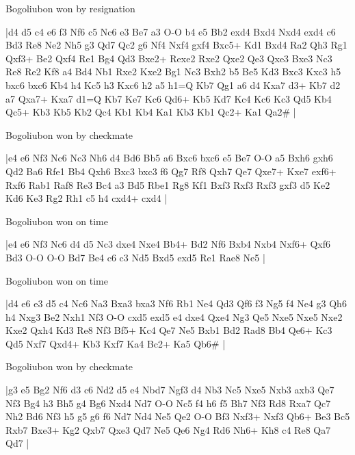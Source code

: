 Bogoliubon won by resignation

\makegametitle
|d4 d5 c4 e6 f3 Nf6 c5 Nc6 e3 Be7 a3 O-O b4 e5 Bb2 exd4 Bxd4 Nxd4 exd4 c6 Bd3 Re8 Ne2 Nh5 g3 Qd7 Qc2 g6 Nf4 Nxf4 gxf4 Bxc5+ Kd1 Bxd4 Ra2 Qh3 Rg1 Qxf3+ Be2 Qxf4 Re1 Bg4 Qd3 Bxe2+ Rexe2 Rxe2 Qxe2 Qe3 Qxe3 Bxe3 Nc3 Re8 Re2 Kf8 a4 Bd4 Nb1 Rxe2 Kxe2 Bg1 Nc3 Bxh2 b5 Be5 Kd3 Bxc3 Kxc3 h5 bxc6 bxc6 Kb4 h4 Kc5 h3 Kxc6 h2 a5 h1=Q Kb7 Qg1 a6 d4 Kxa7 d3+ Kb7 d2 a7 Qxa7+ Kxa7 d1=Q Kb7 Ke7 Kc6 Qd6+ Kb5 Kd7 Kc4 Kc6 Kc3 Qd5 Kb4 Qc5+ Kb3 Kb5 Kb2 Qc4 Kb1 Kb4 Ka1 Kb3 Kb1 Qc2+ Ka1 Qa2\#  |

\showboard

Bogoliubon won by checkmate

\makegametitle
|e4 e6 Nf3 Nc6 Nc3 Nh6 d4 Bd6 Bb5 a6 Bxc6 bxc6 e5 Be7 O-O a5 Bxh6 gxh6 Qd2 Ba6 Rfe1 Bb4 Qxh6 Bxc3 bxc3 f6 Qg7 Rf8 Qxh7 Qe7 Qxe7+ Kxe7 exf6+ Rxf6 Rab1 Raf8 Re3 Bc4 a3 Bd5 Rbe1 Rg8 Kf1 Bxf3 Rxf3 Rxf3 gxf3 d5 Ke2 Kd6 Ke3 Rg2 Rh1 c5 h4 cxd4+ cxd4  |

\showboard

Bogoliubon won on time

\makegametitle
|e4 e6 Nf3 Nc6 d4 d5 Nc3 dxe4 Nxe4 Bb4+ Bd2 Nf6 Bxb4 Nxb4 Nxf6+ Qxf6 Bd3 O-O O-O Bd7 Be4 c6 c3 Nd5 Bxd5 exd5 Re1 Rae8 Ne5  |

\showboard

Bogoliubon won on time

\makegametitle
|d4 e6 e3 d5 c4 Nc6 Na3 Bxa3 bxa3 Nf6 Rb1 Ne4 Qd3 Qf6 f3 Ng5 f4 Ne4 g3 Qh6 h4 Nxg3 Be2 Nxh1 Nf3 O-O cxd5 exd5 e4 dxe4 Qxe4 Ng3 Qe5 Nxe5 Nxe5 Nxe2 Kxe2 Qxh4 Kd3 Re8 Nf3 Bf5+ Kc4 Qe7 Ne5 Bxb1 Bd2 Rad8 Bb4 Qe6+ Kc3 Qd5 Nxf7 Qxd4+ Kb3 Kxf7 Ka4 Bc2+ Ka5 Qb6\#  |

\showboard

Bogoliubon won by checkmate

\makegametitle
|g3 e5 Bg2 Nf6 d3 c6 Nd2 d5 e4 Nbd7 Ngf3 d4 Nb3 Nc5 Nxe5 Nxb3 axb3 Qe7 Nf3 Bg4 h3 Bh5 g4 Bg6 Nxd4 Nd7 O-O Nc5 f4 h6 f5 Bh7 Nf3 Rd8 Rxa7 Qc7 Nh2 Bd6 Nf3 h5 g5 g6 f6 Nd7 Nd4 Ne5 Qe2 O-O Bf3 Nxf3+ Nxf3 Qb6+ Be3 Bc5 Rxb7 Bxe3+ Kg2 Qxb7 Qxe3 Qd7 Ne5 Qe6 Ng4 Rd6 Nh6+ Kh8 c4 Re8 Qa7 Qd7  |

